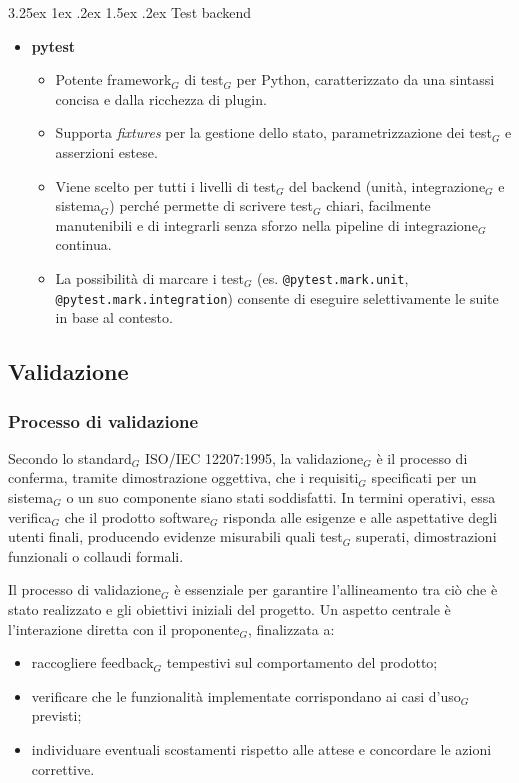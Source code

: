 \documentclass[a4paper, 10pt]{article}
\makeatletter
\renewcommand\paragraph{\@startsection{paragraph}{4}{\z@}%
  {3.25ex \@plus1ex \@minus .2ex}%
  {1.5ex \@plus .2ex}%
  {\normalfont\normalsize\bfseries}}
\makeatother
\begin{document}
\paragraph{Test backend}
\begin{itemize}
    \item \textbf{pytest}
    \begin{itemize}
        \item Potente framework$_G$ di test$_G$ per Python, caratterizzato da una sintassi concisa e dalla ricchezza di plugin.
        \item Supporta \emph{fixtures} per la gestione dello stato, parametrizzazione dei test$_G$ e asserzioni estese.
        \item Viene scelto per tutti i livelli di test$_G$ del backend (unità, integrazione$_G$ e sistema$_G$) perché permette di scrivere test$_G$ chiari, facilmente manutenibili e di integrarli senza sforzo nella pipeline di integrazione$_G$ continua.
        \item La possibilità di marcare i test$_G$ (es. \texttt{@pytest.mark.unit}, \texttt{@pytest.mark.integration}) consente di eseguire selettivamente le suite in base al contesto.
    \end{itemize}
\end{itemize}

\subsection{Validazione}
\label{subsec:validazione}

\subsubsection{Processo di validazione}

Secondo lo standard$_G$ ISO/IEC 12207:1995, la validazione$_G$ è il processo di conferma, tramite dimostrazione oggettiva, che i requisiti$_G$ specificati per un sistema$_G$ o un suo componente siano stati soddisfatti. In termini operativi, essa verifica$_G$ che il prodotto software$_G$ risponda alle esigenze e alle aspettative degli utenti finali, producendo evidenze misurabili quali test$_G$ superati, dimostrazioni funzionali o collaudi formali.

Il processo di validazione$_G$ è essenziale per garantire l'allineamento tra ciò che è stato realizzato e gli obiettivi iniziali del progetto. Un aspetto centrale è l'interazione diretta con il proponente$_G$, finalizzata a:
\begin{itemize}
    \item raccogliere feedback$_G$ tempestivi sul comportamento del prodotto;
    \item verificare che le funzionalità implementate corrispondano ai casi d'uso$_G$ previsti;
    \item individuare eventuali scostamenti rispetto alle attese e concordare le azioni correttive.
\end{itemize}
\end{document}
